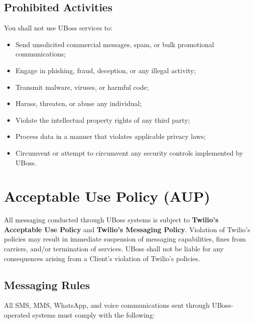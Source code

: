 \documentclass[11pt,letterpaper,parskip=half]{scrartcl}
\begin{document}
\subsection{Prohibited Activities}

You shall not use UBoss services to:

\begin{itemize}[nosep, leftmargin=1.5em]
    \item Send unsolicited commercial messages, spam, or bulk promotional communications;
    \item Engage in phishing, fraud, deception, or any illegal activity;
    \item Transmit malware, viruses, or harmful code;
    \item Harass, threaten, or abuse any individual;
    \item Violate the intellectual property rights of any third party;
    \item Process data in a manner that violates applicable privacy laws;
    \item Circumvent or attempt to circumvent any security controls implemented by UBoss.
\end{itemize}

\section{Acceptable Use Policy (AUP)}

\begin{tcolorbox}[keyterm, title={Twilio Compliance Notice}]
All messaging conducted through UBoss systems is subject to \textbf{Twilio's Acceptable Use Policy} and \textbf{Twilio's Messaging Policy}. Violation of Twilio's policies may result in immediate suspension of messaging capabilities, fines from carriers, and/or termination of services. UBoss shall not be liable for any consequences arising from a Client's violation of Twilio's policies.
\end{tcolorbox}

\subsection{Messaging Rules}

All SMS, MMS, WhatsApp, and voice communications sent through UBoss-operated systems must comply with the following:
\end{document}
